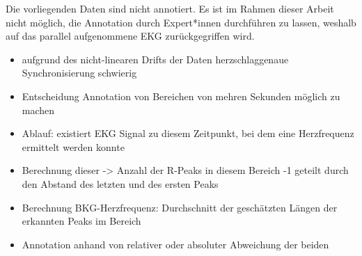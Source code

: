 	Die vorliegenden Daten sind nicht annotiert. Es ist im Rahmen dieser Arbeit nicht möglich, die Annotation durch Expert*innen durchführen zu lassen, weshalb auf das parallel aufgenommene \ac{EKG} zurückgegriffen wird.
	
	\begin{itemize}
		\item aufgrund des nicht-linearen Drifts der Daten herzschlaggenaue Synchronisierung schwierig
		\item Entscheidung Annotation von Bereichen von mehren Sekunden möglich zu machen
		\item Ablauf: existiert EKG Signal zu diesem Zeitpunkt, bei dem eine Herzfrequenz ermittelt werden konnte
		\item Berechnung dieser -> Anzahl der R-Peaks in diesem Bereich -1 geteilt durch den Abstand des letzten und des ersten Peaks
		\item Berechnung \ac{BKG}-Herzfrequenz: Durchschnitt der geschätzten Längen der erkannten Peaks im Bereich
		\item Annotation anhand von relativer oder absoluter Abweichung der beiden
	\end{itemize}
	

